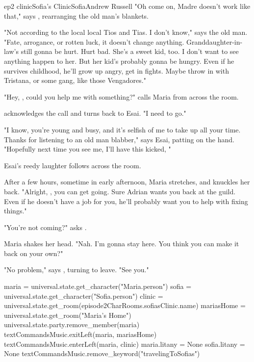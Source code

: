 \documentclass{book}
\begin{document}
\begin{node}{ep2 clinic}{Sofia's Clinic}{Sofia}{Andrew Russell}
    "Oh come on, Madre doesn't work like that," says \name{}, rearranging the old man's blankets.  

    "Not according to the local local Tios and Tias. I don't know," says the old man. "Fate, arrogance, or rotten luck, it doesn't change anything. Granddaughter-in-law's still gonna be hurt. Hurt 
    bad. She's a sweet kid, too. I don't want to see anything happen to 
    her. But her kid's probably gonna be hungry. Even if he survives childhood, he'll grow up angry, get in fights. Maybe throw in with Tristana, or some gang, like those Vengadores."

    "Hey, \name{}, could you help me with something?" calls Maria from across the room.

    \name{} acknowledges the call and turns back to Esai. "I need to go."

    "I know, you're young and busy, and it's selfish of me to take up all your time. Thanks for listening to an old man blabber," says Esai, patting \name{} on the hand. "Hopefully next time you see me, I'll have this kicked, 
    "


    Esai's reedy laughter follows \name{} across the room.

    After a few hours, sometime in early afternoon, Maria stretches, and knuckles her back. "Alright, \name{}, you can get going. Sure Adrian wants you back at the guild. Even if he doesn't have a job for you, he'll probably want you to help with fixing
    things."

    "You're not coming?" asks \name{}.

    Maria shakes her head. "Nah. I'm gonna stay here. You think you can make it back on your own?"

    "No problem," says \name{}, turning to leave. "See you."

    \begin{code}

        maria = universal.state.get_character("Maria.person")
        sofia = universal.state.get_character("Sofia.person")
        clinic = universal.state.get_room(episode2CharRooms.sofiasClinic.name)
        mariasHome = universal.state.get_room("Maria's Home")
        universal.state.party.remove_member(maria)
        textCommandsMusic.exitLeft(maria, mariasHome)
        textCommandsMusic.enterLeft(maria, clinic)
        maria.litany = None
        sofia.litany = None
        textCommandsMusic.remove_keyword("travelingToSofias")

    \end{code}
        
\end{node}
\end{document}
